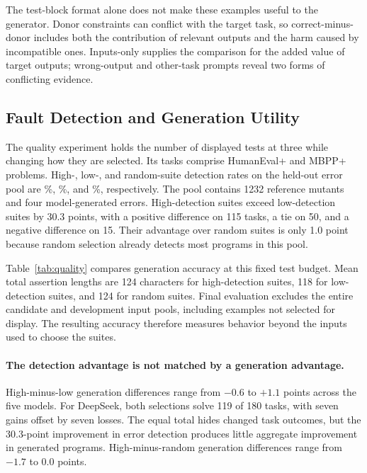 \documentclass[acmsmall,screen,review,anonymous]{acmart}
\begin{document}
The test-block format alone does not make these examples useful to the generator.
Donor constraints can conflict with the target task, so correct-minus-donor includes both the contribution of relevant outputs and the harm caused by incompatible ones.
Inputs-only supplies the comparison for the added value of target outputs; wrong-output and other-task prompts reveal two forms of conflicting evidence.



\subsection{Fault Detection and Generation Utility}

The quality experiment holds the number of displayed tests at three while changing how they are selected.
Its \QualityTasks{} tasks comprise \QualityHE{} HumanEval+ and \QualityMB{} MBPP+ problems.
High-, low-, and random-suite detection rates on the held-out error pool are \QualityHighKill\%, \QualityLowKill\%, and \QualityRandomKill\%, respectively.
The pool contains 1232 reference mutants and four model-generated errors.
High-detection suites exceed low-detection suites by 30.3 points, with a positive difference on 115 tasks, a tie on 50, and a negative difference on 15.
Their advantage over random suites is only 1.0 point because random selection already detects most programs in this pool.

Table~\ref{tab:quality} compares generation accuracy at this fixed test budget.
Mean total assertion lengths are 124 characters for high-detection suites, 118 for low-detection suites, and 124 for random suites.
Final evaluation excludes the entire candidate and development input pools, including examples not selected for display.
The resulting accuracy therefore measures behavior beyond the inputs used to choose the suites.



\paragraph{The detection advantage is not matched by a generation advantage.}
High-minus-low generation differences range from $-0.6$ to $+1.1$ points across the five models.
For DeepSeek, both selections solve 119 of 180 tasks, with seven gains offset by seven losses.
The equal total hides changed task outcomes, but the 30.3-point improvement in error detection produces little aggregate improvement in generated programs.
High-minus-random generation differences range from $-1.7$ to $0.0$ points.
\end{document}
